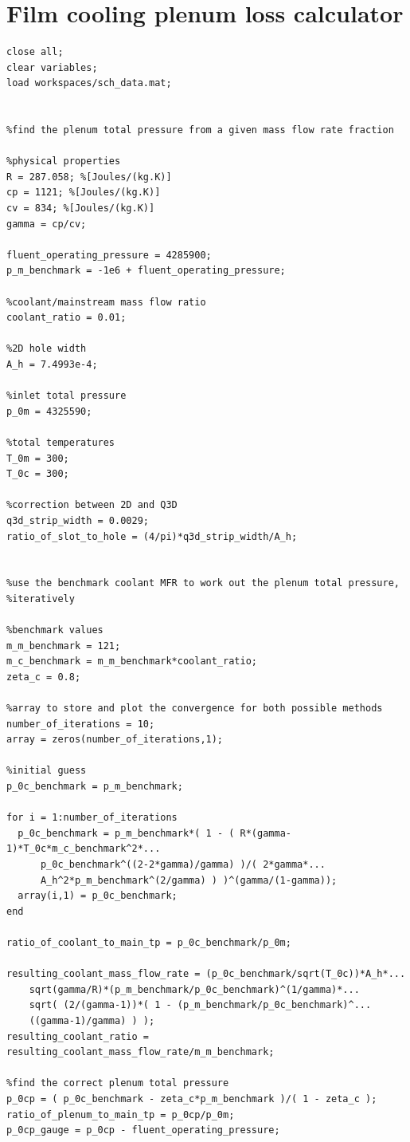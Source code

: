 \documentclass[a4paper, 11pt, oneside]{report}
\begin{document}
\section{Film cooling plenum loss calculator} \label{code_film_cooling_plenum_loss_calculator}
\begin{verbatim}
close all;
clear variables;
load workspaces/sch_data.mat;


%find the plenum total pressure from a given mass flow rate fraction

%physical properties
R = 287.058; %[Joules/(kg.K)]
cp = 1121; %[Joules/(kg.K)]
cv = 834; %[Joules/(kg.K)]
gamma = cp/cv;

fluent_operating_pressure = 4285900;
p_m_benchmark = -1e6 + fluent_operating_pressure;

%coolant/mainstream mass flow ratio
coolant_ratio = 0.01;

%2D hole width
A_h = 7.4993e-4;

%inlet total pressure
p_0m = 4325590;

%total temperatures
T_0m = 300;
T_0c = 300;

%correction between 2D and Q3D
q3d_strip_width = 0.0029;
ratio_of_slot_to_hole = (4/pi)*q3d_strip_width/A_h;


%use the benchmark coolant MFR to work out the plenum total pressure,
%iteratively

%benchmark values
m_m_benchmark = 121;
m_c_benchmark = m_m_benchmark*coolant_ratio;
zeta_c = 0.8;

%array to store and plot the convergence for both possible methods
number_of_iterations = 10;
array = zeros(number_of_iterations,1);

%initial guess
p_0c_benchmark = p_m_benchmark;

for i = 1:number_of_iterations
  p_0c_benchmark = p_m_benchmark*( 1 - ( R*(gamma-1)*T_0c*m_c_benchmark^2*...
      p_0c_benchmark^((2-2*gamma)/gamma) )/( 2*gamma*...
      A_h^2*p_m_benchmark^(2/gamma) ) )^(gamma/(1-gamma));
  array(i,1) = p_0c_benchmark;
end

ratio_of_coolant_to_main_tp = p_0c_benchmark/p_0m;

resulting_coolant_mass_flow_rate = (p_0c_benchmark/sqrt(T_0c))*A_h*...
    sqrt(gamma/R)*(p_m_benchmark/p_0c_benchmark)^(1/gamma)*...
    sqrt( (2/(gamma-1))*( 1 - (p_m_benchmark/p_0c_benchmark)^...
    ((gamma-1)/gamma) ) );
resulting_coolant_ratio = resulting_coolant_mass_flow_rate/m_m_benchmark;

%find the correct plenum total pressure
p_0cp = ( p_0c_benchmark - zeta_c*p_m_benchmark )/( 1 - zeta_c );
ratio_of_plenum_to_main_tp = p_0cp/p_0m;
p_0cp_gauge = p_0cp - fluent_operating_pressure;



\end{verbatim}
\end{document}
